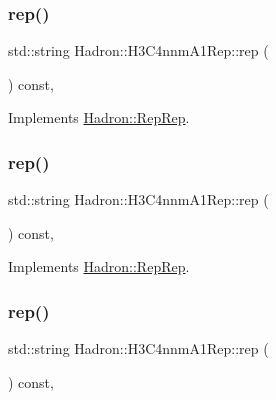 \subsubsection{\texorpdfstring{rep()}{rep()}\hspace{0.1cm}{\footnotesize\ttfamily [1/3]}}
{\footnotesize\ttfamily std\+::string Hadron\+::\+H3\+C4nnm\+A1\+Rep\+::rep (\begin{DoxyParamCaption}{ }\end{DoxyParamCaption}) const\hspace{0.3cm}{\ttfamily [inline]}, {\ttfamily [virtual]}}



Implements \mbox{\hyperlink{structHadron_1_1RepRep_ab3213025f6de249f7095892109575fde}{Hadron\+::\+Rep\+Rep}}.

\mbox{\label{structHadron_1_1H3C4nnmA1Rep_acd94f02734b3fffdeddaef313469d9dc}} 
\subsubsection{\texorpdfstring{rep()}{rep()}\hspace{0.1cm}{\footnotesize\ttfamily [2/3]}}
{\footnotesize\ttfamily std\+::string Hadron\+::\+H3\+C4nnm\+A1\+Rep\+::rep (\begin{DoxyParamCaption}{ }\end{DoxyParamCaption}) const\hspace{0.3cm}{\ttfamily [inline]}, {\ttfamily [virtual]}}



Implements \mbox{\hyperlink{structHadron_1_1RepRep_ab3213025f6de249f7095892109575fde}{Hadron\+::\+Rep\+Rep}}.

\mbox{\label{structHadron_1_1H3C4nnmA1Rep_acd94f02734b3fffdeddaef313469d9dc}} 
\subsubsection{\texorpdfstring{rep()}{rep()}\hspace{0.1cm}{\footnotesize\ttfamily [3/3]}}
{\footnotesize\ttfamily std\+::string Hadron\+::\+H3\+C4nnm\+A1\+Rep\+::rep (\begin{DoxyParamCaption}{ }\end{DoxyParamCaption}) const\hspace{0.3cm}{\ttfamily [inline]}, {\ttfamily [virtual]}}



